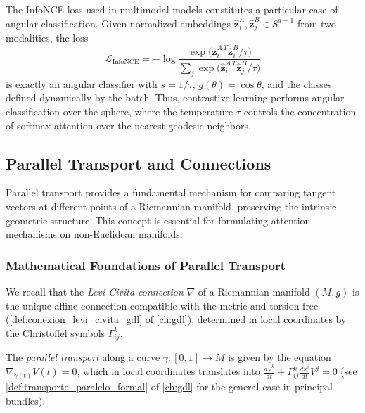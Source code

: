 \begin{remark}\label{rem:contrastive_sphere}
The InfoNCE loss used in multimodal models constitutes a particular case of angular classification. Given normalized embeddings $\hat{\mathbf{z}}_i^A, \hat{\mathbf{z}}_j^B \in S^{d-1}$ from two modalities, the loss
\[
\mathcal{L}_{\text{InfoNCE}} = -\log \frac{\exp\bigl(\hat{\mathbf{z}}_i^{A\,T} \hat{\mathbf{z}}_i^B / \tau\bigr)}{\sum_{j} \exp\bigl(\hat{\mathbf{z}}_i^{A\,T} \hat{\mathbf{z}}_j^B / \tau\bigr)}
\]
is exactly an angular classifier with $s = 1/\tau$, $g(\theta) = \cos\theta$, and the classes defined dynamically by the batch. Thus, contrastive learning performs angular classification over the sphere, where the temperature $\tau$ controls the concentration of softmax attention over the nearest geodesic neighbors.
\end{remark}

\subsection{Parallel Transport and Connections}

Parallel transport provides a fundamental mechanism for comparing tangent vectors at different points of a Riemannian manifold, preserving the intrinsic geometric structure. This concept is essential for formulating attention mechanisms on non-Euclidean manifolds.

\subsubsection{Mathematical Foundations of Parallel Transport}

We recall that the \textit{Levi-Civita connection} $\nabla$ of a Riemannian manifold $(M, g)$ is the unique affine connection compatible with the metric and torsion-free (\autoref{def:conexion_levi_civita_gdl} of \autoref{ch:gdl}), determined in local coordinates by the Christoffel symbols $\Gamma^k_{ij}$.\label{def:levi_civita_attention}\label{eq:christoffel_symbols_attention}

The \textit{parallel transport} along a curve $\gamma: [0,1] \to M$ is given by the equation $\nabla_{\dot{\gamma}(t)} V(t) = 0$, which in local coordinates translates into $\frac{dV^k}{dt} + \Gamma^k_{ij} \frac{dx^i}{dt} V^j = 0$ (see \autoref{def:transporte_paralelo_formal} of \autoref{ch:gdl} for the general case in principal bundles).\label{def:parallel_transport_attention}\label{eq:parallel_transport}\label{eq:parallel_transport_coordinates}


